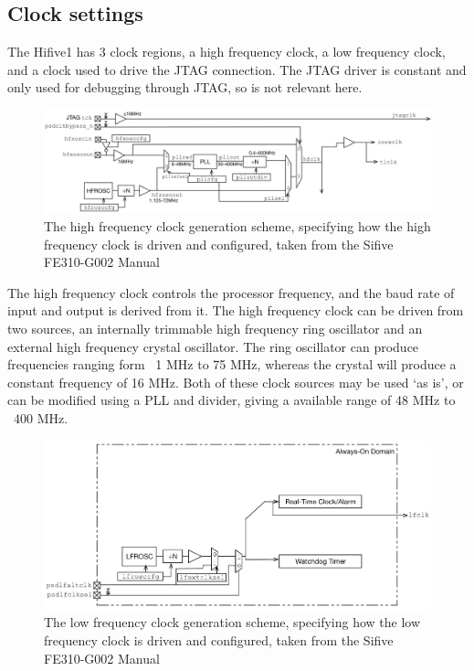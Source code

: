 \subsection{Clock settings}
The Hifive1 has 3 clock regions, a high frequency clock, a low frequency clock, and a clock used to drive the JTAG connection. The JTAG driver is constant and only used for debugging through JTAG, so is not relevant here.
\\

\begin{figure}[H]
    \includegraphics[width=0.9\columnwidth]{figures/hfclock.png}
    \centering
    \caption[High Frequency Clock Diagram]{The high frequency clock generation scheme, specifying how the high frequency clock is driven and configured, taken from the Sifive FE310-G002 Manual\cite{sifive_manual}}
\end{figure}
The high frequency clock controls the processor frequency, and the baud rate of input and output is derived from it. The high frequency clock can be driven from two sources, an internally trimmable high frequency ring oscillator and an external high frequency crystal oscillator. The ring oscillator can produce frequencies ranging form ~1 MHz to 75 MHz, whereas the crystal will produce a constant frequency of 16 MHz. Both of these clock sources may be used `as is', or can be modified using a PLL and divider, giving a available range of 48 MHz to ~400 MHz. 
\\
\begin{figure}[H]
    \includegraphics[width=0.9\columnwidth]{figures/lfclock.png}
    \centering
    \caption[Low Frequency Clock Diagram]{The low frequency clock generation scheme, specifying how the low frequency clock is driven and configured, taken from the Sifive FE310-G002 Manual\cite{sifive_manual}}
\end{figure}
